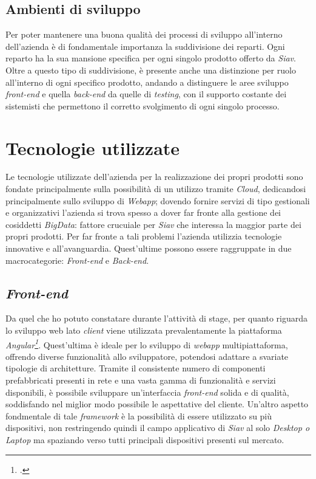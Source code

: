 \subsection{Ambienti di sviluppo}
Per poter mantenere una buona qualità dei processi di sviluppo all'interno dell'azienda è di fondamentale importanza la suddivisione dei reparti. Ogni reparto ha la sua mansione specifica per ogni singolo prodotto offerto da \textit{Siav}. Oltre a questo tipo di suddivisione, è presente anche una distinzione per ruolo all'interno di ogni specifico prodotto, andando a distinguere le aree sviluppo \textit{front-end} e quella \textit{back-end} da quelle di \textit{testing}, con il supporto costante dei sistemisti che permettono il corretto svolgimento di ogni singolo processo.
\section {Tecnologie utilizzate}
Le tecnologie utilizzate dell'azienda per la realizzazione dei propri prodotti sono fondate principalmente sulla possibilità di un utilizzo tramite \textit{\gls{Cloud}}, dedicandosi principalmente sullo sviluppo di \textit{Webapp}; dovendo fornire servizi di tipo gestionali e organizzativi l'azienda si trova spesso a dover far fronte alla gestione dei cosiddetti \textit{\gls{BigData}}: fattore crucuiale per \textit{Siav} che interessa la maggior parte dei propri prodotti. Per far fronte a tali problemi l'azienda utilizzia tecnologie innovative e all'avanguardia. Quest'ultime possono essere raggruppate in due macrocategorie: \textit{Front-end} e \textit{Back-end}.
\subsection{\textit{Front-end}}
Da quel che ho potuto constatare durante l'attività di stage, per quanto riguarda lo sviluppo web lato \textit{client} viene utilizzata prevalentamente la piattaforma \textit{\gls{Angular}\footcite{Angular: https://angular.io/}}.
Quest'ultima è ideale per lo sviluppo di \textit{webapp} multipiattaforma, offrendo diverse funzionalità allo sviluppatore, potendosi adattare a svariate tipologie di architetture.
 Tramite il consistente numero di componenti prefabbricati presenti in rete e una vasta gamma di funzionalità e servizi disponibili, è possibile sviluppare un'interfaccia \textit{front-end} solida e di qualità, soddisfando nel miglior modo possibile le aspettative del cliente. Un'altro aspetto fondmentale di tale \textit{\gls{framework}} è la possibilità di essere utilizzato su più dispositivi, non restringendo quindi il campo applicativo di \textit{Siav} al solo \textit{Desktop o Laptop} ma spaziando verso tutti principali dispositivi presenti sul mercato.
